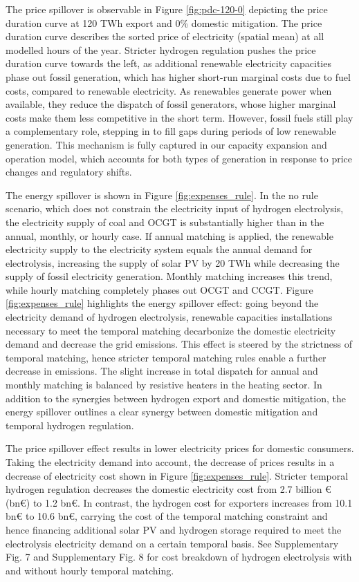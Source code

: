 The price spillover is observable in Figure \ref{fig:pdc-120-0} depicting the price duration curve at 120 TWh export and 0\% domestic \co mitigation. The price duration curve describes the sorted price of electricity (spatial mean) at all modelled hours of the year.
Stricter hydrogen regulation pushes the price duration curve towards the left, as additional renewable electricity capacities phase out fossil generation, which has higher short-run marginal costs due to fuel costs, compared to renewable electricity.
As renewables generate power when available, they reduce the dispatch of fossil generators, whose higher marginal costs make them less competitive in the short term. However, fossil fuels still play a complementary role, stepping in to fill gaps during periods of low renewable generation. This mechanism is fully captured in our capacity expansion and operation model, which accounts for both types of generation in response to price changes and regulatory shifts.


The energy spillover is shown in Figure \ref{fig:expenses_rule}. In the no rule scenario, which does not constrain the electricity input of hydrogen electrolysis, the electricity supply of coal and OCGT is substantially higher than in the annual, monthly, or hourly case. If annual matching is applied, the renewable electricity supply to the electricity system equals the annual demand for electrolysis, increasing the supply of solar PV by 20 TWh while decreasing the supply of fossil electricity generation. 
Monthly matching increases this trend, while hourly matching completely phases out OCGT and CCGT. Figure \ref{fig:expenses_rule} highlights the energy spillover effect: going beyond the electricity demand of hydrogen electrolysis, renewable capacities installations necessary to meet the temporal matching decarbonize the domestic electricity demand and decrease the grid emissions. This effect is steered by the strictness of temporal matching, hence stricter temporal matching rules enable a further decrease in emissions.
The slight increase in total dispatch for annual and monthly matching is balanced by resistive heaters in the heating sector.
In addition to the synergies between hydrogen export and domestic \co mitigation, the energy spillover outlines a clear synergy between domestic \co mitigation and temporal hydrogen regulation.



The price spillover effect results in lower electricity prices for domestic consumers. Taking the electricity demand into account, the decrease of prices results in a decrease of electricity cost shown in 
Figure \ref{fig:expenses_rule}. Stricter temporal hydrogen regulation decreases the domestic electricity cost from 2.7 billion € (bn€) to 1.2 bn€. In contrast, the hydrogen cost for exporters increases from 10.1 bn€ to 10.6 bn€, carrying the cost of the temporal matching constraint and hence financing additional solar PV and hydrogen storage required to meet the electrolysis electricity demand on a certain temporal basis. See Supplementary Fig. 7 and Supplementary Fig. 8 for cost breakdown of hydrogen electrolysis with and without hourly temporal matching. %


